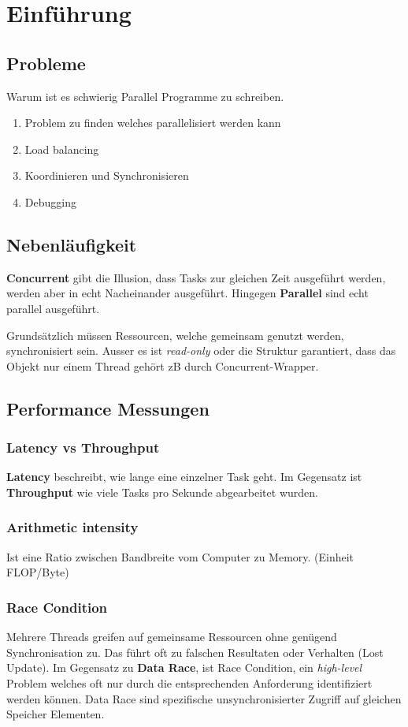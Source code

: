 \section{Einführung}
\subsection{Probleme}
Warum ist es schwierig Parallel Programme zu schreiben.
\begin{enumerate}[nosep]
	\item Problem zu finden welches parallelisiert werden kann
	\item Load balancing
	\item Koordinieren und Synchronisieren
	\item Debugging
\end{enumerate}

\subsection{Nebenläufigkeit}
\textbf{Concurrent} gibt die Illusion, dass Tasks zur gleichen Zeit ausgeführt werden, werden aber in echt Nacheinander ausgeführt. Hingegen \textbf{Parallel} sind echt parallel ausgeführt.

Grundsätzlich müssen Ressourcen, welche gemeinsam genutzt werden, synchronisiert sein. Ausser es ist \textit{read-only} oder die Struktur garantiert, dass das Objekt nur einem Thread gehört zB durch Concurrent-Wrapper.

\subsection{Performance Messungen}\label{performance}
\subsubsection{Latency vs Throughput}
\textbf{Latency} beschreibt, wie lange eine einzelner Task geht. Im Gegensatz ist \textbf{Throughput} wie viele Tasks pro Sekunde abgearbeitet wurden.

\subsubsection{Arithmetic intensity}
Ist eine Ratio zwischen Bandbreite vom Computer zu Memory. (Einheit FLOP/Byte)

\subsubsection{Race Condition}
Mehrere Threads greifen auf gemeinsame Ressourcen ohne genügend Synchronisation zu. Das führt oft zu falschen Resultaten oder Verhalten (Lost Update). Im Gegensatz zu \textbf{Data Race}, ist Race Condition, ein \textit{high-level} Problem welches oft nur durch die entsprechenden Anforderung identifiziert werden können. Data Race sind spezifische unsynchronisierter Zugriff auf gleichen Speicher Elementen. 

